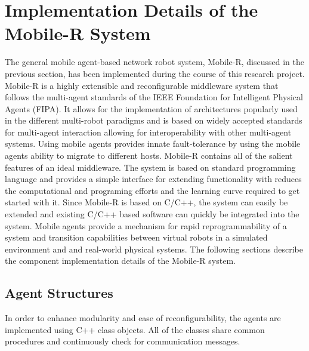 
\chapter{Implementation Details of the Mobile-R System}

  The general mobile agent-based network robot system, Mobile-R, discussed in 
    the previous section, has been implemented during the course of this 
    research project.
  Mobile-R is a highly extensible and reconfigurable middleware system that 
    follows the multi-agent standards of the IEEE Foundation for Intelligent 
    Physical Agents (FIPA).
  It allows for the implementation of architectures popularly used in the 
    different multi-robot paradigms and is based on widely accepted standards 
    for multi-agent interaction allowing for interoperability with other 
    multi-agent systems.
  Using mobile agents provides innate fault-tolerance by using the mobile agents
    ability to migrate to different hosts.
  Mobile-R contains all of the salient features of an ideal middleware.
  The system is based on standard programming language and provides a simple 
    interface for extending functionality with reduces the computational and 
    programing efforts and the learning curve required to get started with it.
  Since Mobile-R is based on C/C++, the system can easily be extended and 
    existing C/C++ based software can quickly be integrated into the system.
  Mobile agents provide a mechanism for rapid reprogrammability of a system and 
    transition capabilities between virtual robots in a simulated environment 
    and and real-world physical systems.
  The following sections describe the component implementation details of the 
    Mobile-R system.

  \section{Agent Structures} \label{sec:impl_agent}
    In order to enhance modularity and ease of reconfigurability, the agents are
      implemented using C++ class objects.
    All of the classes share common procedures and continuously check for 
      communication messages.

